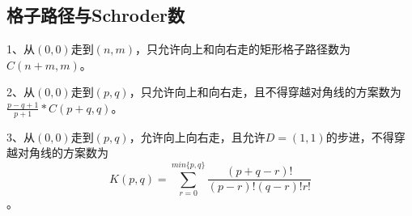 \subsection{格子路径与Schroder数}
		1、从$(0,0)$走到$(n,m)$，只允许向上和向右走的矩形格子路径数为$C(n+m,m)$。\par
		2、从$(0,0)$走到$(p,q)$，只允许向上和向右走，且不得穿越对角线的方案数为$\frac{p-q+1}{p+1}*C(p+q,q)$。\par
		3、从$(0,0)$走到$(p,q)$，允许向上向右走，且允许$D=(1,1)$的步进，不得穿越对角线的方案数为$$K(p,q)=\sum_{r=0}^{min\{p,q\}}\frac{(p+q-r)!}{(p-r)!(q-r)!r!}$$。\par
